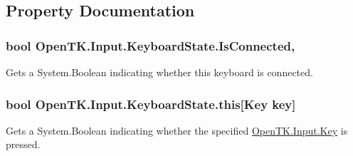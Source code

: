 \subsection{Property Documentation}
\hypertarget{struct_open_t_k_1_1_input_1_1_keyboard_state_a4b3faa1844c0b779665cc3fb42148bb4}{
\subsubsection[{Is\-Connected}]{\setlength{\rightskip}{0pt plus 5cm}bool Open\-T\-K.\-Input.\-Keyboard\-State.\-Is\-Connected\hspace{0.3cm}{\ttfamily [get]}, {\ttfamily [set]}}}\label{struct_open_t_k_1_1_input_1_1_keyboard_state_a4b3faa1844c0b779665cc3fb42148bb4}


Gets a System.\-Boolean indicating whether this keyboard is connected. 

\hypertarget{struct_open_t_k_1_1_input_1_1_keyboard_state_a407bff9cc22f30a385a9c0dc17fb81a4}{
\subsubsection[{this[Key key]}]{\setlength{\rightskip}{0pt plus 5cm}bool Open\-T\-K.\-Input.\-Keyboard\-State.\-this\mbox{[}{\bf Key} key\mbox{]}\hspace{0.3cm}{\ttfamily [get]}}}\label{struct_open_t_k_1_1_input_1_1_keyboard_state_a407bff9cc22f30a385a9c0dc17fb81a4}


Gets a System.\-Boolean indicating whether the specified \hyperlink{namespace_open_t_k_1_1_input_a30415d20dcc907a84693777cc0bdf1c7}{Open\-T\-K.\-Input.\-Key} is pressed. 


